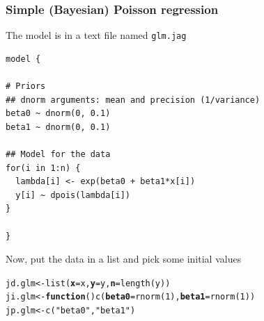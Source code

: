 \documentclass[color=usenames,dvipsnames]{beamer}\usepackage[]{graphicx}\usepackage[]{color}
\makeatletter
\newcommand{\hlnum}[1]{\textcolor[rgb]{0.69,0.494,0}{#1}}%
\newcommand{\hlstr}[1]{\textcolor[rgb]{0.749,0.012,0.012}{#1}}%
\newcommand{\hlstd}[1]{\textcolor[rgb]{0,0,0}{#1}}%
\newcommand{\hlkwa}[1]{\textcolor[rgb]{0,0,0}{\textbf{#1}}}%
\newcommand{\hlkwb}[1]{\textcolor[rgb]{0,0.341,0.682}{#1}}%
\newcommand{\hlkwc}[1]{\textcolor[rgb]{0,0,0}{\textbf{#1}}}%
\newcommand{\hlkwd}[1]{\textcolor[rgb]{0.004,0.004,0.506}{#1}}%
\newenvironment{kframe}{%
 \def\at@end@of@kframe{}%
 \ifinner\ifhmode%
  \def\at@end@of@kframe{\end{minipage}}%
  \begin{minipage}{\columnwidth}%
 \fi\fi%
 \def\FrameCommand##1{\hskip\@totalleftmargin \hskip-\fboxsep
 \colorbox{shadecolor}{##1}\hskip-\fboxsep
     \hskip-\linewidth \hskip-\@totalleftmargin \hskip\columnwidth}%
 \MakeFramed {\advance\hsize-\width
   \@totalleftmargin\z@ \linewidth\hsize
   \@setminipage}}%
 {\par\unskip\endMakeFramed%
 \at@end@of@kframe}
\newenvironment{knitrout}{}{} %
\makeatother
\begin{document}
\begin{frame}[fragile]
  \frametitle{Simple (Bayesian) Poisson regression}
  \small
  The model is in a text file named {\tt glm.jag} \\
\begin{knitrout}\scriptsize
{}\color{fgcolor}\begin{kframe}
\begin{verbatim}
model {

# Priors
## dnorm arguments: mean and precision (1/variance)
beta0 ~ dnorm(0, 0.1)  
beta1 ~ dnorm(0, 0.1)

## Model for the data
for(i in 1:n) {
  lambda[i] <- exp(beta0 + beta1*x[i])
  y[i] ~ dpois(lambda[i])
}

}
\end{verbatim}
\end{kframe}
\end{knitrout}
\pause
\vfill
Now, put the data in a list and pick some initial values
\begin{knitrout}
\color{fgcolor}\begin{kframe}
\begin{alltt}
\hlstd{jd.glm} \hlkwb{<-} \hlkwd{list}\hlstd{(}\hlkwc{x}\hlstd{=x,} \hlkwc{y}\hlstd{=y,} \hlkwc{n}\hlstd{=}\hlkwd{length}\hlstd{(y))}
\hlstd{ji.glm} \hlkwb{<-} \hlkwa{function}\hlstd{()} \hlkwd{c}\hlstd{(}\hlkwc{beta0}\hlstd{=}\hlkwd{rnorm}\hlstd{(}\hlnum{1}\hlstd{),} \hlkwc{beta1}\hlstd{=}\hlkwd{rnorm}\hlstd{(}\hlnum{1}\hlstd{))}
\hlstd{jp.glm} \hlkwb{<-} \hlkwd{c}\hlstd{(}\hlstr{"beta0"}\hlstd{,} \hlstr{"beta1"}\hlstd{)}
\end{alltt}
\end{kframe}
\end{knitrout}
\end{frame}
\end{document}
